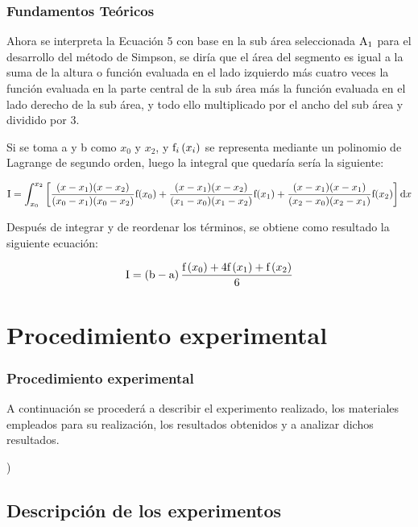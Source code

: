 \documentclass{beamer}
\begin{document}
\begin{frame}
\frametitle{Fundamentos Teóricos}
	Ahora se interpreta la Ecuación 5 con base en la sub área seleccionada $\textup{A}_{1}$ para el desarrollo del método de Simpson, se diría que el área del segmento es igual a la suma de la altura o función evaluada en el lado izquierdo más cuatro veces la función evaluada en la parte central de la sub área más la función evaluada en el lado derecho de la sub área, y todo ello multiplicado por el ancho del sub área y dividido por 3.
	
	Si se toma a y b como $ x_{0} $ y $ x_{2} $, y $ \textup{f}_{i}\left(x_{i}\right) $ se representa mediante un polinomio de Lagrange de segundo orden, luego la integral que quedaría sería la siguiente:
	
	\[ \textup{I} = \int_{x_{0}}^{x_{2}}\left[\frac{(x - x_{1})(x - x_{2})}{(x_{0} - x_{1})(x_{0} - x_{2})}\textup{f}(x_{0}) + \frac{(x 
	- x_{1})(x - x_{2})}{(x_{1} - x_{0})(x_{1} - x_{2})}\textup{f}(x_{1}) + \frac{(x - x_{1})(x - x_{1})}{(x_{2} - x_{0})(x_{2} - 
	x_{1})}\textup{f}(x_{2})\right]\textup{d}x\]	
	
	Después de integrar y de reordenar los términos, se obtiene como resultado la siguiente ecuación:
	
	\[\textup{I} = \left(\textup{b}-\textup{a}\right)\frac{\textup{f}\left(x_{0}\right) + 4\textup{f}\left(x_{1}\right) + \textup{f}\left(x_{2}\right)}{6}\]

\end{frame}


\section{Procedimiento experimental}

\begin{frame}
\frametitle{Procedimiento experimental}

	A continuación se procederá a describir el experimento realizado, los materiales empleados para su realización,
los resultados obtenidos y a analizar dichos resultados.

\end{frame}) 

\subsection{Descripción de los experimentos}
\end{document}
